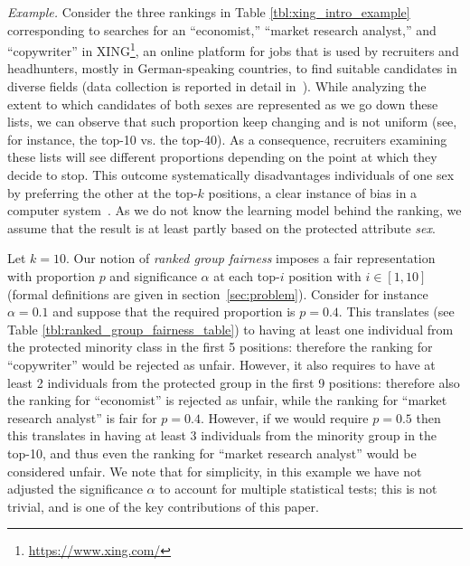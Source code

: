 \medskip
\textit{Example.} Consider the three rankings in Table \ref{tbl:xing_intro_example} corresponding to searches for an ``economist,'' ``market research analyst,'' and ``copywriter'' in XING\footnote{\url{https://www.xing.com/}}, an online platform for jobs that is used by recruiters and headhunters, mostly in German-speaking countries, to find suitable candidates in diverse fields (data collection is reported in detail in~\cite{zehlike2017fair}). While analyzing  the extent to which candidates of both sexes are represented as we go down these lists,  we can observe that such proportion keep changing and is not uniform (see, for instance, the top-10 vs. the top-40). As a consequence, recruiters examining these lists will see different proportions depending on the point at which they decide to stop.
%
This outcome systematically disadvantages individuals of one sex by preferring the other at the top-$k$ positions, a clear instance of bias in a computer system~\cite{friedman1996bias}. As we do not know the learning model behind the ranking, we assume that the result is at least partly based on the protected attribute \emph{sex}.

Let $k = 10$. Our notion of \textit{ranked group fairness} imposes a fair representation with proportion $p$ and significance $\alpha$ at each top-$i$ position with $i \in [1,10]$ (formal definitions are given in section~\ref{sec:problem}).
Consider for instance $\alpha = 0.1$ and suppose that the required proportion is $p = 0.4$.  This translates (see Table \ref{tbl:ranked_group_fairness_table}) to having at least one individual from the protected minority class in the first 5 positions: therefore the ranking for  ``copywriter'' would be rejected as unfair. However, it also requires to have at least 2 individuals from the protected group in the first 9 positions: therefore also the ranking for ``economist'' is rejected as unfair, while the ranking for ``market research analyst'' is fair for  $p = 0.4$. However, if we would require $p = 0.5$ then this translates in having at least 3 individuals from the minority group in the top-10, and thus even the ranking for ``market research analyst'' would be considered unfair.
%
We note that for simplicity, in this example we have not adjusted the significance $\alpha$ to account for multiple statistical tests; this is not trivial, and is one of the key contributions of this paper.

\medskip

